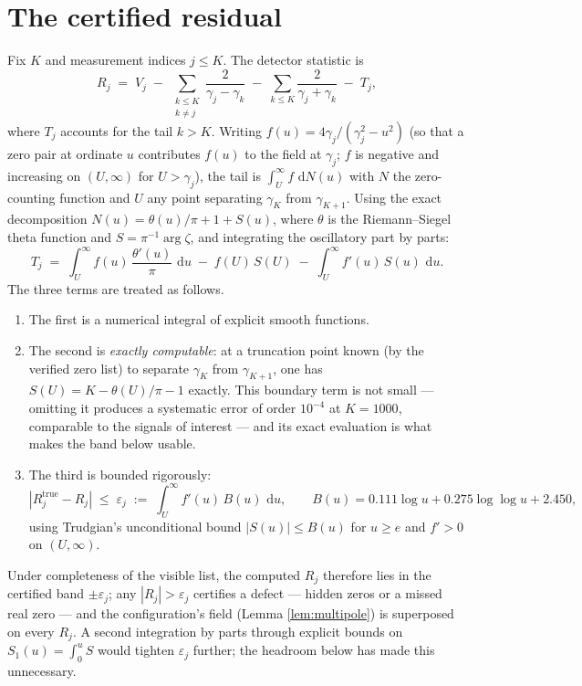 \documentclass[11pt]{amsart}
\theoremstyle{remark}
\newcommand{\dd}{\,\mathrm{d}}
\begin{document}
\section{The certified residual}\label{sec:certified}

Fix $K$ and measurement indices $j\le K$. The detector statistic is
\begin{equation}\label{eq:residual}
R_j \;=\; V_j \;-\; \sum_{\substack{k\le K\\ k\ne j}}\frac{2}{\gamma_j-\gamma_k}
\;-\; \sum_{k\le K}\frac{2}{\gamma_j+\gamma_k} \;-\; T_j,
\end{equation}
where $T_j$ accounts for the tail $k>K$. Writing $f(u)=4\gamma_j/(\gamma_j^2-u^2)$ (so that a zero pair at ordinate $u$ contributes $f(u)$ to the field at $\gamma_j$; $f$ is negative and increasing on $(U,\infty)$ for $U>\gamma_j$), the tail is $\int_U^\infty f\,\dd N(u)$ with $N$ the zero-counting function and $U$ any point separating $\gamma_K$ from $\gamma_{K+1}$. Using the exact decomposition $N(u)=\theta(u)/\pi+1+S(u)$, where $\theta$ is the Riemann--Siegel theta function and $S=\pi^{-1}\arg\zeta$, and integrating the oscillatory part by parts:
\begin{equation}\label{eq:tail}
T_j \;=\; \int_U^\infty f(u)\,\frac{\theta'(u)}{\pi}\,\dd u \;-\; f(U)\,S(U) \;-\; \int_U^\infty f'(u)\,S(u)\,\dd u .
\end{equation}
The three terms are treated as follows.
\begin{enumerate}
\item The first is a numerical integral of explicit smooth functions.
\item The second is \emph{exactly computable}: at a truncation point known (by the verified zero list) to separate $\gamma_K$ from $\gamma_{K+1}$, one has $S(U)=K-\theta(U)/\pi-1$ exactly. This boundary term is not small --- omitting it produces a systematic error of order $10^{-4}$ at $K=1000$, comparable to the signals of interest --- and its exact evaluation is what makes the band below usable.
\item The third is bounded rigorously:
\[
|R_j^{\mathrm{true}} - R_j| \;\le\; \varepsilon_j \;:=\; \int_U^\infty f'(u)\,B(u)\,\dd u,
\qquad B(u) = 0.111\log u+0.275\log\log u+2.450,
\]
using Trudgian's unconditional bound $|S(u)|\le B(u)$ for $u\ge e$ \cite{Trudgian} and $f'>0$ on $(U,\infty)$.
\end{enumerate}
Under completeness of the visible list, the computed $R_j$ therefore lies in the certified band $\pm\varepsilon_j$; any $|R_j|>\varepsilon_j$ certifies a defect --- hidden zeros or a missed real zero --- and the configuration's field (Lemma \ref{lem:multipole}) is superposed on every $R_j$. A second integration by parts through explicit bounds on $S_1(u)=\int_0^u S$ would tighten $\varepsilon_j$ further; the headroom below has made this unnecessary.
\end{document}

